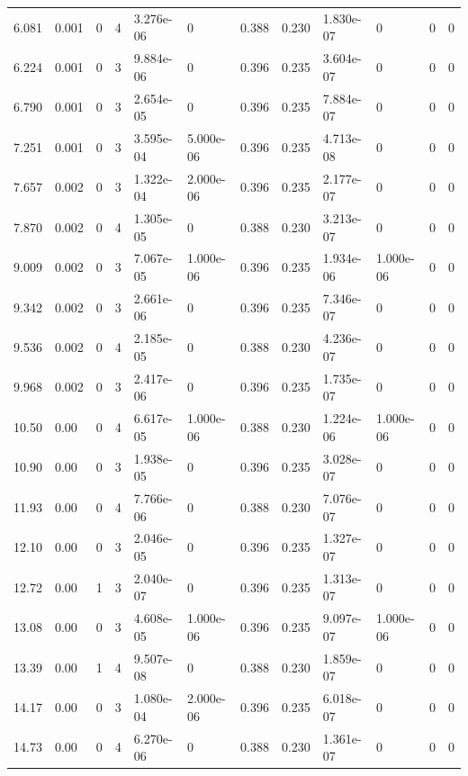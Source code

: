 \documentclass[preview]{standalone}
\begin{document}
{{\begin{tabular}{L{1.2cm}C{1.2cm} C{0.3cm}C{0.5cm} C{1.4cm}C{1.4cm} C{1.4cm}C{1.4cm} C{1.6cm}C{1.6cm} C{1.6cm}C{1.6cm}}
  6.081  &  0.001  & 0     &  4 &  3.276e-06  & 0  &  0.388&   0.230& 1.830e-07 & 0   &  0 & 0  \\ 
  6.224  &  0.001  & 0     &  3 &  9.884e-06  & 0  &  0.396&   0.235& 3.604e-07 & 0   &  0 & 0  \\ 
  6.790  &  0.001  & 0     &  3 &  2.654e-05  & 0  &  0.396&   0.235& 7.884e-07 & 0   &  0 & 0  \\ 
  7.251  &  0.001  & 0     &  3 &  3.595e-04  & 5.000e-06  &  0.396&   0.235& 4.713e-08 & 0   &  0 & 0  \\ 
  7.657  &  0.002  & 0     &  3 &  1.322e-04  & 2.000e-06  &  0.396&   0.235& 2.177e-07 & 0   &  0 & 0  \\ 
  7.870  &  0.002  & 0     &  4 &  1.305e-05  & 0  &  0.388&   0.230& 3.213e-07 & 0   &  0 & 0  \\ 
  9.009  &  0.002  & 0     &  3 &  7.067e-05  & 1.000e-06  &  0.396&   0.235& 1.934e-06 & 1.000e-06   &  0 & 0  \\ 
  9.342  &  0.002  & 0     &  3 &  2.661e-06  & 0  &  0.396&   0.235& 7.346e-07 & 0   &  0 & 0  \\ 
  9.536  &  0.002  & 0     &  4 &  2.185e-05  & 0  &  0.388&   0.230& 4.236e-07 & 0   &  0 & 0  \\ 
  9.968  &  0.002  & 0     &  3 &  2.417e-06  & 0  &  0.396&   0.235& 1.735e-07 & 0   &  0 & 0  \\ 
  10.50  &  0.00  & 0     &  4 &  6.617e-05  & 1.000e-06  &  0.388&   0.230& 1.224e-06 & 1.000e-06   &  0 & 0  \\ 
  10.90  &  0.00  & 0     &  3 &  1.938e-05  & 0  &  0.396&   0.235& 3.028e-07 & 0   &  0 & 0  \\ 
  11.93  &  0.00  & 0     &  4 &  7.766e-06  & 0  &  0.388&   0.230& 7.076e-07 & 0   &  0 & 0  \\ 
  12.10  &  0.00  & 0     &  3 &  2.046e-05  & 0  &  0.396&   0.235& 1.327e-07 & 0   &  0 & 0  \\ 
  12.72  &  0.00  & 1     &  3 &  2.040e-07  & 0  &  0.396&   0.235& 1.313e-07 & 0   &  0 & 0  \\ 
  13.08  &  0.00  & 0     &  3 &  4.608e-05  & 1.000e-06  &  0.396&   0.235& 9.097e-07 & 1.000e-06   &  0 & 0  \\ 
  13.39  &  0.00  & 1     &  4 &  9.507e-08  & 0  &  0.388&   0.230& 1.859e-07 & 0   &  0 & 0  \\ 
  14.17  &  0.00  & 0     &  3 &  1.080e-04  & 2.000e-06  &  0.396&   0.235& 6.018e-07 & 0   &  0 & 0  \\ 
  14.73  &  0.00  & 0     &  4 &  6.270e-06  & 0  &  0.388&   0.230& 1.361e-07 & 0   &  0 & 0  \\ 

\end{tabular}}}
\end{document}
